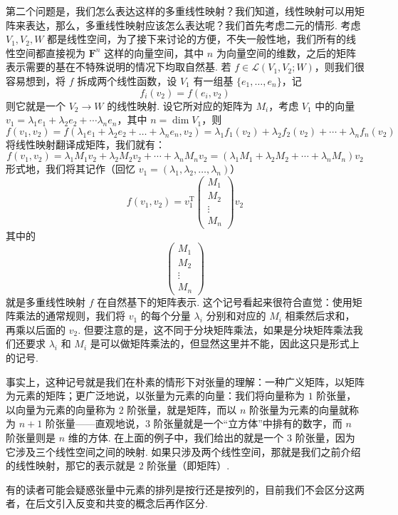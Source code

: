 第二个问题是，我们怎么表达这样的多重线性映射？我们知道，线性映射可以用矩阵来表达，那么，多重线性映射应该怎么表达呢？我们首先考虑二元的情形. 考虑 $V_1, V_2, W$ 都是线性空间，为了接下来讨论的方便，不失一般性地，我们所有的线性空间都直接视为 $\mathbf{F}^n$ 这样的向量空间，其中 $n$ 为向量空间的维数，之后的矩阵表示需要的基在不特殊说明的情况下均取自然基. 若 $f \in \mathcal{L}(V_1, V_2; W)$，则我们很容易想到，将 $f$ 拆成两个线性函数，设 $V_1$ 有一组基 $\{e_1,\ldots,e_n\}$，记
\[
f_i (v_2) = f(e_i, v_2)
\]
则它就是一个 $V_2 \to W$ 的线性映射. 设它所对应的矩阵为 $M_i$，考虑 $V_1$ 中的向量 $v_1 = \lambda_1 e_1 + \lambda_2 e_2 + \cdots \lambda_n e_n$，其中 $n = \dim V_1$，则
\[
f(v_1, v_2) = f(\lambda_1 e_1 + \lambda_2 e_2 + \dots + \lambda_n e_n, v_2) = \lambda_1 f_1 (v_2) + \lambda_2 f_2 (v_2) + \cdots + \lambda_n f_n (v_2)
\]
将线性映射翻译成矩阵，我们就有：
\[
f(v_1, v_2) = \lambda_1 M_1 v_2 + \lambda_2 M_2 v_2 + \cdots + \lambda_n M_n v_2 = (\lambda_1 M_1 + \lambda_2 M_2 + \cdots + \lambda_n M_n) v_2
\]
形式地，我们将其记作（回忆 $v_1 = (\lambda_1,\lambda_2,\ldots,\lambda_n)$）
\[
    f(v_1, v_2) = v_1^\mathrm{T} \begin{pmatrix}
        M_1 \\ M_2 \\ \vdots \\ M_n
    \end{pmatrix}
    v_2
\]
其中的
\[\begin{pmatrix}
        M_1 \\ M_2 \\ \vdots \\ M_n
    \end{pmatrix}\]
就是多重线性映射 $f$ 在自然基下的矩阵表示. 这个记号看起来很符合直觉：使用矩阵乘法的通常规则，我们将 $v_1$ 的每个分量 $\lambda_i$ 分别和对应的 $M_i$ 相乘然后求和，再乘以后面的 $v_2$. 但要注意的是，这不同于分块矩阵乘法，如果是分块矩阵乘法我们还要求 $\lambda_i$ 和 $M_i$ 是可以做矩阵乘法的，但显然这里并不能，因此这只是形式上的记号.

事实上，这种记号就是我们在朴素的情形下对张量的理解：一种广义矩阵，以矩阵为元素的矩阵；更广泛地说，以张量为元素的向量：我们将向量称为 $1$ 阶张量，以向量为元素的向量称为 $2$ 阶张量，就是矩阵，而以 $n$ 阶张量为元素的向量就称为 $n + 1$ 阶张量——直观地说，$3$ 阶张量就是一个“立方体”中排有的数字，而 $n$ 阶张量则是 $n$ 维的方体. 在上面的例子中，我们给出的就是一个 $3$ 阶张量，因为它涉及三个线性空间之间的映射. 如果只涉及两个线性空间，那就是我们之前介绍的线性映射，那它的表示就是 $2$ 阶张量（即矩阵）.

有的读者可能会疑惑张量中元素的排列是按行还是按列的，目前我们不会区分这两者，在后文引入反变和共变的概念后再作区分.

